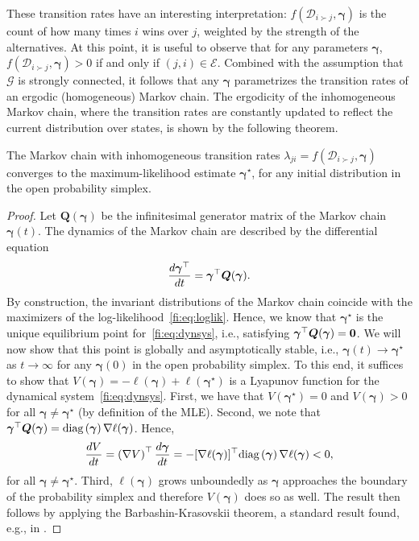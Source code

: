 These transition rates have an interesting interpretation: $f(\mathcal{D}_{i \succ j}, \bm{\gamma})$ is the count of how many times $i$ wins over $j$, weighted by the strength of the alternatives.
At this point, it is useful to observe that for any parameters $\bm{\gamma}$, $f(\mathcal{D}_{i \succ j}, \bm{\gamma}) > 0$ if and only if $(j,i) \in \mathcal{E}$.
Combined with the assumption that $\mathcal{G}$ is strongly connected, it follows that any $\bm{\gamma}$ parametrizes the transition rates of an ergodic (homogeneous) Markov chain.
The ergodicity of the inhomogeneous Markov chain, where the transition rates are constantly updated to reflect the current distribution over states, is shown by the following theorem.
\begin{theorem}
\label{fi:thm:convergence}
The Markov chain with inhomogeneous transition rates $\lambda_{ji} = f(\mathcal{D}_{i \succ j}, \bm{\gamma})$ converges to the maximum-likelihood estimate $\bm{\gamma}^\star$, for any initial distribution in the open probability simplex.
\end{theorem}

\begin{proof}[Proof]
Let $\bm{Q}(\bm{\gamma})$ be the infinitesimal generator matrix of the Markov chain $\bm{\gamma}(t)$.
The dynamics of the Markov chain are described by the differential equation
\begin{align}
\label{fi:eq:dynsys}
\frac{d \bm{\gamma}^\top}{dt} = \bm{\gamma}^\top \bm{Q}(\bm{\gamma}).
\end{align}
By construction, the invariant distributions of the Markov chain coincide with the maximizers of the log-likelihood~\eqref{fi:eq:loglik}.
Hence, we know that $\bm{\gamma}^\star$ is the unique equilibrium point for~\eqref{fi:eq:dynsys}, i.e., satisfying $\bm{\gamma}^\top \bm{Q}(\bm{\gamma}) = \bm{0}$.
We will now show that this point is globally and asymptotically stable, i.e., $\bm{\gamma}(t) \to \bm{\gamma}^\star$ as $t \to \infty$ for any $\bm{\gamma}(0)$ in the open probability simplex.
To this end, it suffices to show that $V(\bm{\gamma}) = - \ell(\bm{\gamma}) + \ell(\bm{\gamma}^\star)$ is a Lyapunov function for the dynamical system~\eqref{fi:eq:dynsys}.
First, we have that $V(\bm{\gamma}^\star) = 0$ and $V(\bm{\gamma}) > 0$ for all $\bm{\gamma} \ne \bm{\gamma}^\star$ (by definition of the MLE).
Second, we note that $\bm{\gamma}^\top \bm{Q}(\bm{\gamma}) = \text{diag} \left( \bm{\gamma} \right)  \nabla \ell(\bm{\gamma})$.
Hence,
\begin{align*}
\frac{dV}{dt}
    = \left( \nabla V \right)^\top \frac{d \bm{\gamma}}{dt}
    = - [\nabla \ell(\bm{\gamma})]^\top \text{diag} \left( \bm{\gamma} \right)  \nabla \ell(\bm{\gamma})
    < 0,
\end{align*}
for all $\bm{\gamma} \ne \bm{\gamma}^\star$.
Third, $\ell(\bm{\gamma})$ grows unboundedly as $\bm{\gamma}$ approaches the boundary of the probability simplex \citep[Lemma~1]{hunter2004mm} and therefore $V(\bm{\gamma})$ does so as well.
The result then follows by applying the Barbashin-Krasovskii theorem, a standard result found, e.g., in \citet[Chapter~3]{khalil1996nonlinear}.
\end{proof}


